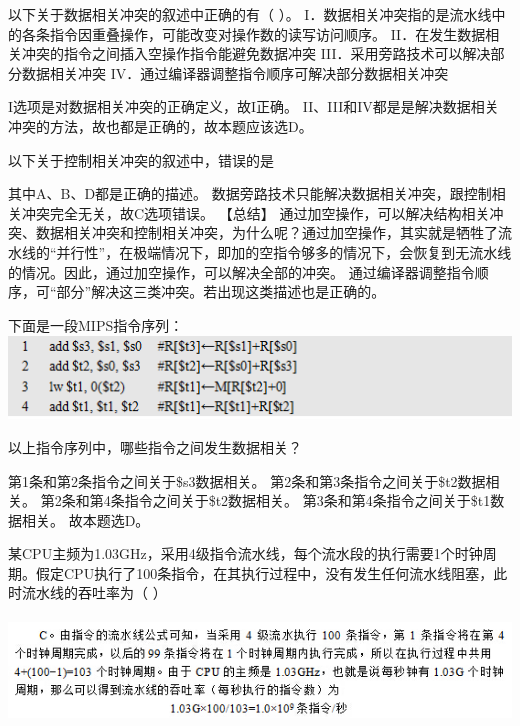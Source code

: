 \question 以下关于数据相关冲突的叙述中正确的有（ ）。
I．数据相关冲突指的是流水线中的各条指令因重叠操作，可能改变对操作数的读写访问顺序。
II．在发生数据相关冲突的指令之间插入空操作指令能避免数据冲突
III．采用旁路技术可以解决部分数据相关冲突
IV．通过编译器调整指令顺序可解决部分数据相关冲突
\par{}
\begin{solution}I选项是对数据相关冲突的正确定义，故I正确。
II、III和IV都是是解决数据相关冲突的方法，故也都是正确的，故本题应该选D。
\end{solution}
\question 以下关于控制相关冲突的叙述中，错误的是
\par{}
\begin{solution}其中A、B、D都是正确的描述。
数据旁路技术只能解决数据相关冲突，跟控制相关冲突完全无关，故C选项错误。
【总结】
通过加空操作，可以解决结构相关冲突、数据相关冲突和控制相关冲突，为什么呢？通过加空操作，其实就是牺牲了流水线的``并行性''，在极端情况下，即加的空指令够多的情况下，会恢复到无流水线的情况。因此，通过加空操作，可以解决全部的冲突。
通过编译器调整指令顺序，可``部分''解决这三类冲突。若出现这类描述也是正确的。
\end{solution}
\question 下面是一段MIPS指令序列：
\includegraphics[width=5.33333in,height=0.87500in]{computerassets/e3e987b0dc6aa40b5c4452ae4b71aef8.png}

以上指令序列中，哪些指令之间发生数据相关？
\par{}
\begin{solution}第1条和第2条指令之间关于\$s3数据相关。
第2条和第3条指令之间关于\$t2数据相关。
第2条和第4条指令之间关于\$t2数据相关。
第3条和第4条指令之间关于\$t1数据相关。 故本题选D。
\end{solution}
\question 某CPU主频为1.03GHz，采用4级指令流水线，每个流水段的执行需要1个时钟周期。假定CPU执行了100条指令，在其执行过程中，没有发生任何流水线阻塞，此时流水线的吞吐率为（
）
\par{}
\begin{solution}\includegraphics[width=5.73958in,height=1.09375in]{computerassets/7e707ae279824ceb7945f57d5c919616.jpeg}
\end{solution}
